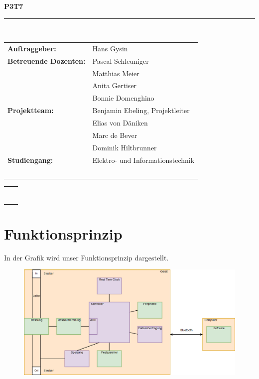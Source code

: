 \documentclass[12pt,a4paper]{article}
\begin{document}
\begin{center}


\newcommand{\HRule}{\rule{\linewidth}{0.5mm}}

{\begin{Huge}\textbf{P3T7}\end{Huge}}
\HRule \\[0.5cm]

\begin{tabular}{l l}
\textbf{Auftraggeber:} & Hans Gysin \\[0.2cm]
\textbf{Betreuende Dozenten:} & Pascal Schleuniger  \\ & Matthias Meier \\  & Anita Gertiser \\& Bonnie Domenghino \\[0.2cm]
\textbf{Projektteam:} & Benjamin Ebeling, Projektleiter \\ & Elias von Däniken \\ & Marc de Bever \\ & Dominik Hiltbrunner   \\[0.2cm]
\textbf{Studiengang:} & Elektro- und Informationstechnik\\\

\end{tabular}
\begin{tabular}{l l}
\HRule \\[0.5cm]
\end{tabular}
\end{center}



\section{Funktionsprinzip}
In der Grafik wird unser Funktionsprinzip dargestellt.
\\

\begin{figure}[htbp] 
  \centering
\includegraphics[scale=0.45]{P3T7-Blockdiagramm.png}
  \caption{}
  \label{fig:Bild1}
\end{figure}
\end{document}
